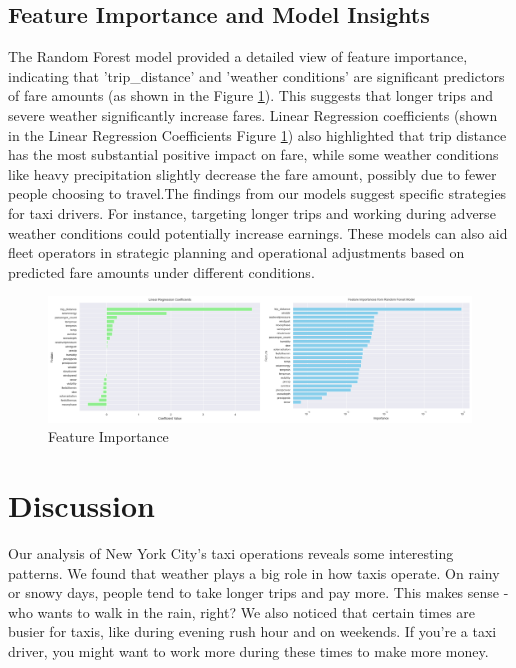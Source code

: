 \documentclass[11pt]{article}
\begin{document}
\subsection{Feature Importance and Model Insights}
The Random Forest model provided a detailed view of feature importance, indicating that 'trip\_distance' and 'weather conditions' are significant predictors of fare amounts (as shown in the Figure \ref{fig:7}). This suggests that longer trips and severe weather significantly increase fares. Linear Regression coefficients (shown in the Linear Regression Coefficients Figure \ref{fig:7}) also highlighted that trip distance has the most substantial positive impact on fare, while some weather conditions like heavy precipitation slightly decrease the fare amount, possibly due to fewer people choosing to travel.The findings from our models suggest specific strategies for taxi drivers. For instance, targeting longer trips and working during adverse weather conditions could potentially increase earnings. These models can also aid fleet operators in strategic planning and operational adjustments based on predicted fare amounts under different conditions.

\begin{figure}[h]
    \includegraphics[width=1.\textwidth]{image/model.png}
    \centering
    \caption{Feature Importance} %
    \label{fig:7}
    
\end{figure}

\section{Discussion}
Our analysis of New York City's taxi operations reveals some interesting patterns. We found that weather plays a big role in how taxis operate. On rainy or snowy days, people tend to take longer trips and pay more. This makes sense - who wants to walk in the rain, right? We also noticed that certain times are busier for taxis, like during evening rush hour and on weekends. If you're a taxi driver, you might want to work more during these times to make more money.
\end{document}
